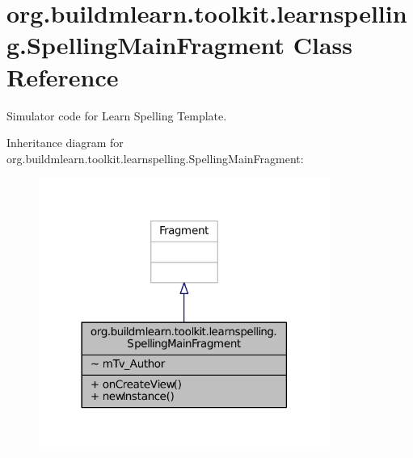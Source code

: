 \hypertarget{classorg_1_1buildmlearn_1_1toolkit_1_1learnspelling_1_1SpellingMainFragment}{\section{org.\-buildmlearn.\-toolkit.\-learnspelling.\-Spelling\-Main\-Fragment Class Reference}
\label{classorg_1_1buildmlearn_1_1toolkit_1_1learnspelling_1_1SpellingMainFragment}
}


Simulator code for Learn Spelling Template.  




Inheritance diagram for org.\-buildmlearn.\-toolkit.\-learnspelling.\-Spelling\-Main\-Fragment\-:
\nopagebreak
\begin{figure}[H]
\begin{center}
\leavevmode
\includegraphics[width=270pt]{d9/d67/classorg_1_1buildmlearn_1_1toolkit_1_1learnspelling_1_1SpellingMainFragment__inherit__graph}
\end{center}
\end{figure}


